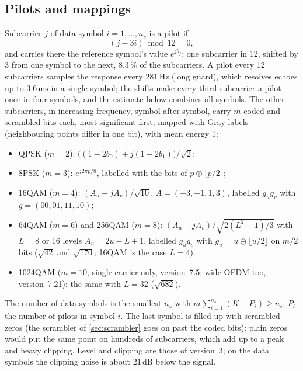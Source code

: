 \documentclass[11pt,a4paper]{article}
\newcommand{\Hz}{\,\mathrm{Hz}}
\newcommand{\ms}{\,\mathrm{ms}}
\newcommand{\dB}{\,\mathrm{dB}}
\newcommand{\nc}{n_{\mathrm{c}}}
\theoremstyle{remark}
\begin{document}
\subsection{Pilots and mappings}
Subcarrier $j$ of data symbol $i = 1, \dots, n_s$ is a pilot if
\begin{equation}
(j - 3i) \bmod 12 = 0,
\label{eq:pilots}
\end{equation}
and carries there the reference symbol's value $e^{j\theta_j}$: one subcarrier in 12, shifted by 3 from one symbol to the next, $8.3\,\%$ of the subcarriers. A pilot every 12 subcarriers samples the response every $281\Hz$ (long guard), which resolves echoes up to $3.6\ms$ in a single symbol; the shifts make every third subcarrier a pilot once in four symbols, and the estimate below combines all symbols. The other subcarriers, in increasing frequency, symbol after symbol, carry $m$ coded and scrambled bits each, most significant first, mapped with Gray labels~\cite{gray} (neighbouring points differ in one bit), with mean energy 1:
\begin{itemize}
\item QPSK ($m = 2$): $\bigl((1 - 2b_0) + j(1 - 2b_1)\bigr)/\sqrt2$;
\item 8PSK ($m = 3$): $e^{j2\pi p/8}$, labelled with the bits of $p \oplus \lfloor p/2 \rfloor$;
\item 16QAM ($m = 4$): $(A_u + jA_v)/\sqrt{10}$, $A = (-3, -1, 1, 3)$, labelled $g_u g_v$ with $g = (00, 01, 11, 10)$;
\item 64QAM ($m = 6$) and 256QAM ($m = 8$): $(A_u + jA_v)/\sqrt{2(L^2 - 1)/3}$ with $L = 8$ or 16 levels $A_u = 2u - L + 1$, labelled $g_u g_v$ with $g_u = u \oplus \lfloor u/2 \rfloor$ on $m/2$ bits ($\sqrt{42}$ and $\sqrt{170}$; 16QAM is the case $L = 4$).
\item 1024QAM ($m = 10$, single carrier only, version~7.5; wide OFDM too, version~7.21): the same with $L = 32$ ($\sqrt{682}$).
\end{itemize}
The number of data symbols is the smallest $n_s$ with $m \sum_{i=1}^{n_s} (K - P_i) \ge \nc$, $P_i$ the number of pilots in symbol $i$. The last symbol is filled up with scrambled zeros (the scrambler of \cref{sec:scrambler} goes on past the coded bits): plain zeros would put the same point on hundreds of subcarriers, which add up to a peak and heavy clipping. Level and clipping are those of version~3; on the data symbols the clipping noise is about $21\dB$ below the signal.
\end{document}
